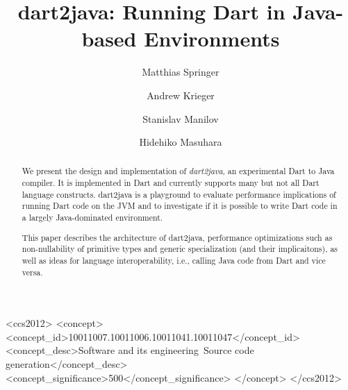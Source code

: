 \documentclass[sigplan]{acmart}
\begin{document}
\title{{dart2java}: Running Dart in Java-based Environments}

\newcommand\Mark[1]{\textsuperscript#1}


\author[M. Springer]{Matthias Springer}

\author[A. Krieger]{Andrew Krieger}

\author[S. Manilov]{Stanislav Manilov}

\author[H. Masuhara]{Hidehiko Masuhara}



\setlength{\belowcaptionskip}{-5pt}

\begin{abstract}
We present the design and implementation of \emph{dart2java}, an experimental Dart to Java compiler. It is implemented in Dart and currently supports many but not all Dart language constructs. dart2java is a playground to evaluate performance implications of running Dart code on the JVM and to investigate if it is possible to write Dart code in a largely Java-dominated environment.

This paper describes the architecture of dart2java, performance optimizations such as non-nullability of primitive types and generic specialization (and their implicaitons), as well as ideas for language interoperability, i.e., calling Java code from Dart and vice versa.
\end{abstract}

\begin{CCSXML}
<ccs2012>
<concept>
<concept_id>10011007.10011006.10011041.10011047</concept_id>
<concept_desc>Software and its engineering~Source code generation</concept_desc>
<concept_significance>500</concept_significance>
</concept>
</ccs2012>
\end{CCSXML}
\end{document}
